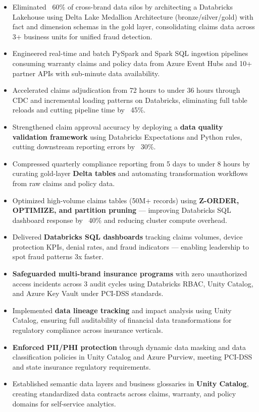 \documentclass[a4paper,10pt]{article}
\begin{document}
\begin{itemize}
    \item Eliminated ~60\% of cross-brand data silos by architecting a Databricks Lakehouse using Delta Lake Medallion Architecture (bronze/silver/gold) with fact and dimension schemas in the gold layer, consolidating claims data across 3+ business units for unified fraud detection.
    \item Engineered real-time and batch PySpark and Spark SQL ingestion pipelines consuming warranty claims and policy data from Azure Event Hubs and 10+ partner APIs with sub-minute data availability.
    \item Accelerated claims adjudication from 72 hours to under 36 hours through CDC and incremental loading patterns on Databricks, eliminating full table reloads and cutting pipeline time by ~45\%.
    \item Strengthened claim approval accuracy by deploying a \textbf{data quality validation framework} using Databricks Expectations and Python rules, cutting downstream reporting errors by ~30\%.
    \item Compressed quarterly compliance reporting from 5 days to under 8 hours by curating gold-layer \textbf{Delta tables} and automating transformation workflows from raw claims and policy data.
    \item Optimized high-volume claims tables (50M+ records) using \textbf{Z-ORDER, OPTIMIZE, and partition pruning} — improving Databricks SQL dashboard response by ~40\% and reducing cluster compute overhead.
    \item Delivered \textbf{Databricks SQL dashboards} tracking claims volumes, device protection KPIs, denial rates, and fraud indicators — enabling leadership to spot fraud patterns 3x faster.
    \item \textbf{Safeguarded multi-brand insurance programs} with zero unauthorized access incidents across 3 audit cycles using Databricks RBAC, Unity Catalog, and Azure Key Vault under PCI-DSS standards.
    \item Implemented \textbf{data lineage tracking} and impact analysis using Unity Catalog, ensuring full auditability of financial data transformations for regulatory compliance across insurance verticals.
    \item \textbf{Enforced PII/PHI protection} through dynamic data masking and data classification policies in Unity Catalog and Azure Purview, meeting PCI-DSS and state insurance regulatory requirements.
    \item Established semantic data layers and business glossaries in \textbf{Unity Catalog}, creating standardized data contracts across claims, warranty, and policy domains for self-service analytics.

\end{itemize}
\end{document}
